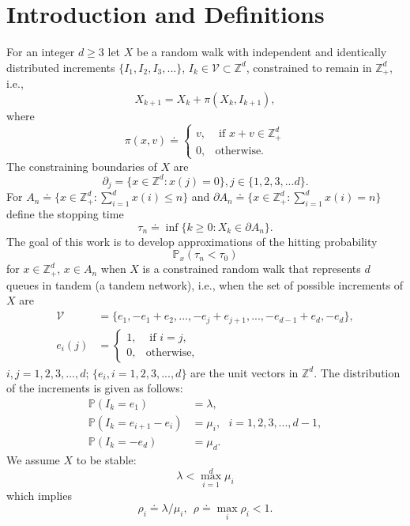 \documentclass[11pt,a4paper]{article}
\begin{document}
\section{Introduction and Definitions}
For an integer $d \ge 3$
let $X$ be a random walk with independent and identically
distributed increments $\{I_1,I_2,I_3,...\}$, $I_k \in {\mathcal V} \subset {\mathbb Z}^d$,  constrained
to remain in ${\mathbb Z}_+^d$, i.e.,
\[
X_{k+1} = X_k + \pi(X_k,I_{k+1}),
\]
where
\[
\pi(x,v) \doteq \begin{cases} v, &\text{ if } x +v \in {\mathbb Z}_+^d \\
				  0      , &\text{otherwise.}
\end{cases}
\]
The constraining boundaries of $X$ are
\[
\partial_j = \{ x \in {\mathbb Z}^d: x(j) = 0 \}, j \in \{1,2,3,...d\}.
\]
For 
$ A_n \doteq \{ x \in {\mathbb Z}_+^d: \sum_{i=1}^d x(i) \le n \}$
and
$\partial A_n \doteq \{ x \in {\mathbb Z}_+^d: \sum_{i=1}^d x(i) = n \}$
define the stopping time
\[
\tau_n \doteq \inf \{k \ge 0: X_k \in \partial A_n\}.
\]
The goal of this work is to develop approximations of the hitting
probability
\[
{\mathbb P}_x( \tau_n < \tau_0) 
\]
for $x \in {\mathbb Z}_+^d$,  $x \in A_n$
when $X$ is a constrained random walk that represents $d$ queues
in tandem (a tandem network), i.e., 
when the set of possible increments of $X$
are
\begin{align*}
{\mathcal V} &= \{e_1, -e_1 + e_2,..., -e_j+e_{j+1},...,-e_{d-1}+e_d, -e_d \},\\
e_i(j) &= \begin{cases} 1, &\text{ if } i = j,\\
		       0, &\text{otherwise,}
\end{cases}
\end{align*}
$i,j=1,2,3,...,d$; $\{e_i,i=1,2,3,...,d\}$
are the unit vectors in ${\mathbb Z}^d$.
The distribution of the increments is given as follows:
\begin{align*}
{\mathbb P}(I_k = e_1) &= \lambda, \\
{\mathbb P}(I_k = e_{i+1}-e_{i}) &= \mu_i,~~~ i=1,2,3,...,d-1,\\
{\mathbb P}(I_k = -e_d) &= \mu_d.
\end{align*}
We assume $X$ to be stable:
\begin{equation}\label{as:stability}
\lambda < \max_{i=1}^d \mu_i
\end{equation}
which implies
\[
\rho_i \doteq \lambda/\mu_i, ~~\rho \doteq \max_i \rho_i < 1.
\]
\end{document}
